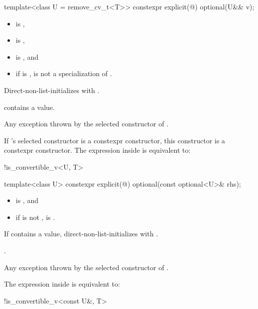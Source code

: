 %
\begin{itemdecl}
template<class U = remove_cv_t<T>> constexpr explicit(@\seebelow@) optional(U&& v);
\end{itemdecl}

\begin{itemdescr}
\pnum
\constraints
\begin{itemize}
\item {} is ,
\item {} is ,
\item {} is , and
\item if  is \cv{} ,
 is not a specialization of .
\end{itemize}

\pnum
\effects
Direct-non-list-initializes 
with .

\pnum
\ensures
{} contains a value.

\pnum
\throws
Any exception thrown by the selected constructor of .

\pnum
\remarks
If 's selected constructor is a constexpr constructor,
this constructor is a constexpr constructor.
The expression inside  is equivalent to:
\begin{codeblock}
!is_convertible_v<U, T>
\end{codeblock}
\end{itemdescr}

%
\begin{itemdecl}
template<class U> constexpr explicit(@\seebelow@) optional(const optional<U>& rhs);
\end{itemdecl}

\begin{itemdescr}
\pnum
\constraints
\begin{itemize}
\item {} is , and
\item if  is not \cv{} ,
 is .
\end{itemize}

\pnum
\effects
If  contains a value,
direct-non-list-initializes 
with .

\pnum
\ensures
{}.

\pnum
\throws
Any exception thrown by the selected constructor of .

\pnum
\remarks
The expression inside  is equivalent to:
\begin{codeblock}
!is_convertible_v<const U&, T>
\end{codeblock}
\end{itemdescr}


